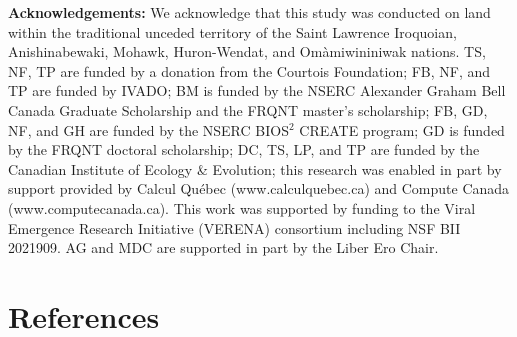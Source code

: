 \documentclass[10pt,oneside]{article}
\begin{document}
\textbf{Acknowledgements:} We acknowledge that this study was conducted
on land within the traditional unceded territory of the Saint Lawrence
Iroquoian, Anishinabewaki, Mohawk, Huron-Wendat, and Omàmiwininiwak
nations. TS, NF, TP are funded by a donation from the Courtois
Foundation; FB, NF, and TP are funded by IVADO; BM is funded by the
NSERC Alexander Graham Bell Canada Graduate Scholarship and the FRQNT
master's scholarship; FB, GD, NF, and GH are funded by the NSERC
BIOS\(^2\) CREATE program; GD is funded by the FRQNT doctoral
scholarship; DC, TS, LP, and TP are funded by the Canadian Institute of
Ecology \& Evolution; this research was enabled in part by support
provided by Calcul Québec (www.calculquebec.ca) and Compute Canada
(www.computecanada.ca). This work was supported by funding to the Viral
Emergence Research Initiative (VERENA) consortium including NSF BII
2021909. AG and MDC are supported in part by the Liber Ero Chair.

\hypertarget{references}{%
\section*{References}\label{references}}
\end{document}
